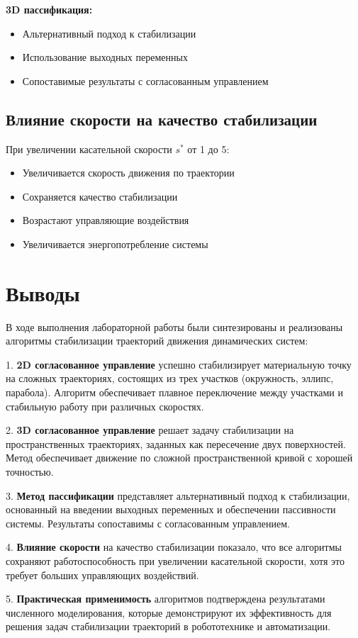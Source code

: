 \textbf{3D пассификация:}
\begin{itemize}
\item Альтернативный подход к стабилизации
\item Использование выходных переменных
\item Сопоставимые результаты с согласованным управлением
\end{itemize}

\subsection{Влияние скорости на качество стабилизации}

При увеличении касательной скорости $s^*$ от 1 до 5:
\begin{itemize}
\item Увеличивается скорость движения по траектории
\item Сохраняется качество стабилизации
\item Возрастают управляющие воздействия
\item Увеличивается энергопотребление системы
\end{itemize}

\section{Выводы}

В ходе выполнения лабораторной работы были синтезированы и реализованы алгоритмы стабилизации траекторий движения динамических систем:

1. \textbf{2D согласованное управление} успешно стабилизирует материальную точку на сложных траекториях, состоящих из трех участков (окружность, эллипс, парабола). Алгоритм обеспечивает плавное переключение между участками и стабильную работу при различных скоростях.

2. \textbf{3D согласованное управление} решает задачу стабилизации на пространственных траекториях, заданных как пересечение двух поверхностей. Метод обеспечивает движение по сложной пространственной кривой с хорошей точностью.

3. \textbf{Метод пассификации} представляет альтернативный подход к стабилизации, основанный на введении выходных переменных и обеспечении пассивности системы. Результаты сопоставимы с согласованным управлением.

4. \textbf{Влияние скорости} на качество стабилизации показало, что все алгоритмы сохраняют работоспособность при увеличении касательной скорости, хотя это требует больших управляющих воздействий.

5. \textbf{Практическая применимость} алгоритмов подтверждена результатами численного моделирования, которые демонстрируют их эффективность для решения задач стабилизации траекторий в робототехнике и автоматизации.

